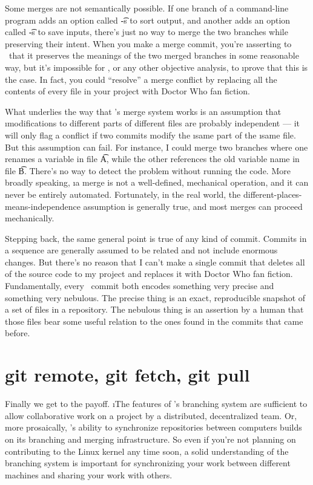 \documentclass[letterpaper,12pt,titlepage,twoside]{article}
\begin{document}
Some merges are not semantically possible. If one branch of a command-line
program adds an option called \t{-s} to sort output, and another adds an
option called \t{-s} to save inputs, there's just no way to merge the two
branches while preserving their intent. When you make a merge commit, you're
\i{asserting} to \git\ that it preserves the meanings of the two merged
branches in some reasonable way, but it's impossible for \git, or any other
objective analysis, to \i{prove} that this is the case. In fact, you could
``resolve'' a merge conflict by replacing all the contents of every file in
your project with Doctor Who fan fiction.

What underlies the way that \git's merge system works is an assumption that
\i{modifications to different parts of different files are probably
  independent} --- it will only flag a conflict if two commits modify the
\i{same} part of the \i{same} file. But this assumption can fail. For
instance, I could merge two branches where one renames a variable in file
\t{A}, while the other references the old variable name in file \t{B}. There's
no way to detect the problem without running the code. More broadly speaking,
\i{a merge is not a well-defined, mechanical operation, and it can never be
  entirely automated}. Fortunately, in the real world, the
different-places-means-independence assumption is generally true, and most
merges can proceed mechanically.

Stepping back, the same general point is true of any kind of commit. Commits
in a sequence are generally assumed to be related and not include enormous
changes. But there's no reason that I can't make a single commit that deletes
all of the source code to my project and replaces it with Doctor Who fan
fiction. Fundamentally, every \git\ commit both encodes something very precise
and something very nebulous. The precise thing is an exact, reproducible
snapshot of a set of files in a repository. The nebulous thing is an assertion
by a human that those files bear some useful relation to the ones found in the
commits that came before.


\section{git remote, git fetch, git pull}

Finally we get to the payoff. \i{The features of \git's branching system are
  sufficient to allow collaborative work on a project by a distributed,
  decentralized team.} Or, more prosaically, \git's ability to synchronize
repositories between computers builds on its branching and merging
infrastructure. So even if you're not planning on contributing to the Linux
kernel any time soon, a solid understanding of the branching system is
important for synchronizing your work between different machines and sharing
your work with others.
\end{document}
